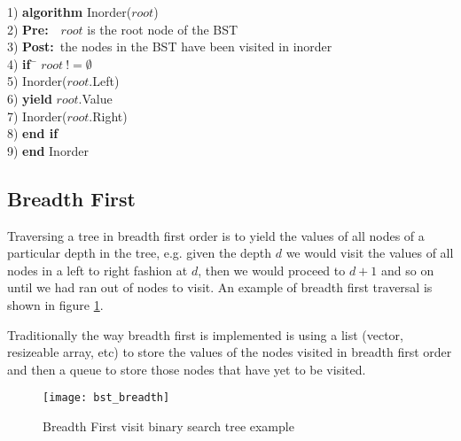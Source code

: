\begin{tabbing}
1)  \textbf{alg}\= \textbf{orithm} Inorder($root$) \\
2)  \> \textbf{Pre:}~~$root$ is the root node of the BST \\
3)  \> \textbf{Post:}~the nodes in the BST have been visited in inorder \\
4)  \> \textbf{if}~\= $root~!= \emptyset$ \\
5)  \> \> Inorder($root$.Left) \\
6)  \> \> \textbf{yield} $root$.Value \\
7)  \> \> Inorder($root$.Right) \\
8)  \> \textbf{end if} \\
9)  \textbf{end} Inorder \\
\end{tabbing}

\subsection{Breadth First} \label{breadth_first}
Traversing a tree in breadth first order is to yield the values of all nodes of a particular depth in the tree, e.g. given the depth $d$ we would visit the values of all nodes in a left to right fashion at $d$, then we would proceed to $d+1$ and so on until we had ran out of nodes to visit. An example of breadth first traversal is shown in figure \ref{fig:bst_breadth}.

Traditionally the way breadth first is implemented is using a list (vector, resizeable array, etc) to store the values of the nodes visited in breadth first order and then a queue to store those nodes that have yet to be visited.

\begin{figure}[htp]
\begin{center}
\texttt{[image: bst\_breadth]}
\end{center}
\caption{Breadth First visit binary search tree example} \label{fig:bst_breadth}
\end{figure}


